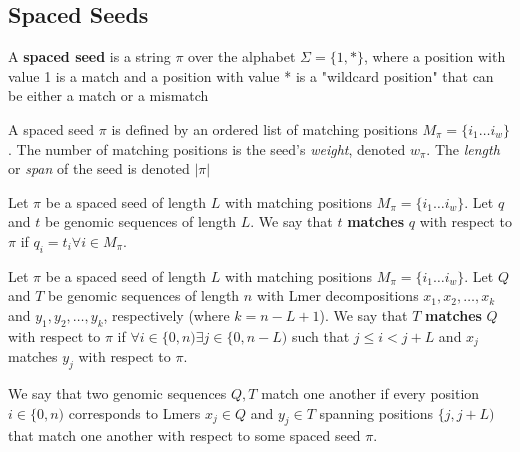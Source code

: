 \subsection{Spaced Seeds}
\begin{defn}
A \textbf{spaced seed} is a string $\pi$ over the alphabet $\Sigma =\lbrace 1,* \rbrace$, where a position with value 1 is a match and a position with value * is a "wildcard position" that can be either a match or a mismatch \cite{chao:2008:sequence} \end{defn}

A spaced seed $\pi$ is defined by an ordered list of matching positions $M_{\pi} = \lbrace i_{1} \dotsc i_{w} \rbrace$. The number of matching positions is the seed's \textit{weight}, denoted $w_{\pi}$. The \textit{length} or \textit{span} of the seed is denoted $\lvert \pi \rvert$ \cite{buhler:2005:designing}

\begin{defn}
Let $\pi$ be a spaced seed of length $L$ with matching positions $M_{\pi} = \lbrace i_{1} \dotsc i_{w} \rbrace$. Let $q$ and $t$ be genomic sequences of length $L$. We say that $t$ \textbf{matches} $q$ with respect to $\pi$ if $q_{i} = t_{i} \forall i \in M_{\pi}$.
\end{defn}

\begin{defn}
Let $\pi$ be a spaced seed of length $L$ with matching positions $M_{\pi} = \lbrace i_{1} \dotsc i_{w} \rbrace$. Let $Q$ and $T$ be genomic sequences of length $n$ with Lmer decompositions $x_{1},x_{2},\dotsc ,x_{k}$ and $y_{1},y_{2},\dotsc ,y_{k}$, respectively (where $k = n - L + 1$). We say that $T$ \textbf{matches} $Q$ with respect to $\pi$ if $\forall i \in \lbrace 0, n) \exists j \in \lbrace 0, n-L)$ such that $j \leq i < j+L$ and $x_{j}$ matches $y_{j}$ with respect to $\pi$.
\end{defn}

We say that two genomic sequences $Q,T$ match one another if every position $i \in \lbrace 0,n)$ corresponds to Lmers $x_{j} \in Q$ and $y_{j} \in T$ spanning positions $\lbrace j,j+L)$ that match one another with respect to some spaced seed $\pi$. 